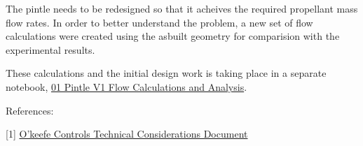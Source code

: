 \documentclass[11pt]{article}
\begin{document}
The pintle needs to be redesigned so that it acheives the required
propellant mass flow rates. In order to better understand the problem, a
new set of flow calculations were created using the asbuilt geometry for
comparision with the experimental results.

These calculations and the initial design work is taking place in a
separate notebook,
\href{https://github.com/psas/liquid-engine-test-stand/blob/master/Pintle/Pintle_V1\%20testing/01\%20Pintle\%20V1\%20Flow\%20Calculations\%20and\%20Analysis.ipynb}{01
Pintle V1 Flow Calculations and Analysis}.

    References:

{[}1{]} \href{Images/Orifice\%20Technical\%20Considerations.pdf}{O'keefe
Controls Technical Considerations Document}

    


    
    
    
    
\end{document}
